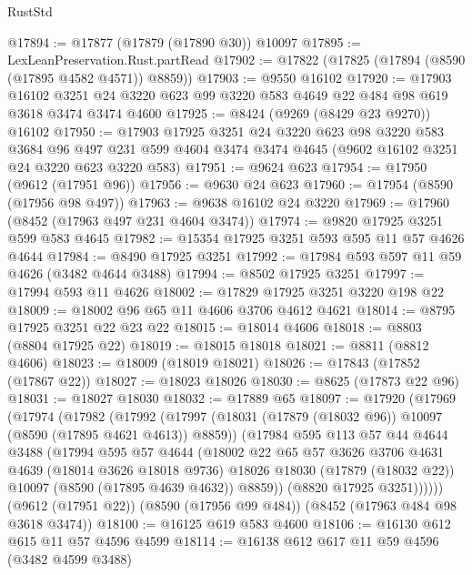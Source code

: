 \begin{lexlean}{RustStd}
\begin{coremodule}
@17894 := @17877 (@17879 (@17890 @30)) @10097
@17895 := LexLeanPreservation.Rust.partRead
@17902 := @17822 (@17825 (@17894 (@8590 (@17895 @4582 @4571)) @8859))
@17903 := @9550 @16102
@17920 := @17903
    @16102
    @3251
    @24
    @3220
    @623
    @99
    @3220
    @583
    @4649
    @22
    @484
    @98
    @619
    @3618
    @3474
    @3474
    @4600
@17925 := @8424 (@9269 (@8429 @23 @9270)) @16102
@17950 := @17903
    @17925
    @3251
    @24
    @3220
    @623
    @98
    @3220
    @583
    @3684
    @96
    @497
    @231
    @599
    @4604
    @3474
    @3474
    @4645
    (@9602 @16102 @3251 @24 @3220 @623 @3220 @583)
@17951 := @9624 @623
@17954 := @17950 (@9612 (@17951 @96))
@17956 := @9630 @24 @623
@17960 := @17954 (@8590 (@17956 @98 @497))
@17963 := @9638 @16102 @24 @3220
@17969 := @17960 (@8452 (@17963 @497 @231 @4604 @3474))
@17974 := @9820 @17925 @3251 @599 @583 @4645
@17982 := @15354 @17925 @3251 @593 @595 @11 @57 @4626 @4644
@17984 := @8490 @17925 @3251
@17992 := @17984 @593 @597 @11 @59 @4626 (@3482 @4644 @3488)
@17994 := @8502 @17925 @3251
@17997 := @17994 @593 @11 @4626
@18002 := @17829 @17925 @3251 @3220 @198 @22
@18009 := @18002 @96 @65 @11 @4606 @3706 @4612 @4621
@18014 := @8795 @17925 @3251 @22 @23 @22
@18015 := @18014 @4606
@18018 := @8803 (@8804 @17925 @22)
@18019 := @18015 @18018
@18021 := @8811 (@8812 @4606)
@18023 := @18009 (@18019 @18021)
@18026 := @17843 (@17852 (@17867 @22))
@18027 := @18023 @18026
@18030 := @8625 (@17873 @22 @96)
@18031 := @18027 @18030
@18032 := @17889 @65
@18097 := @17920
    (@17969
      (@17974
        (@17982
          (@17992
            (@17997 (@18031 (@17879 (@18032 @96)) @10097 (@8590 (@17895 @4621 @4613)) @8859))
            (@17984
              @595
              @113
              @57
              @44
              @4644
              @3488
              (@17994
                @595
                @57
                @4644
                (@18002
                  @22
                  @65
                  @57
                  @3626
                  @3706
                  @4631
                  @4639
                  (@18014 @3626 @18018 @9736)
                  @18026
                  @18030
                  (@17879 (@18032 @22))
                  @10097
                  (@8590 (@17895 @4639 @4632))
                  @8859))
              (@8820 @17925 @3251))))))
    (@9612 (@17951 @22))
    (@8590 (@17956 @99 @484))
    (@8452 (@17963 @484 @98 @3618 @3474))
@18100 := @16125 @619 @583 @4600
@18106 := @16130 @612 @615 @11 @57 @4596 @4599
@18114 := @16138 @612 @617 @11 @59 @4596 (@3482 @4599 @3488)

\end{coremodule}
\end{lexlean}
